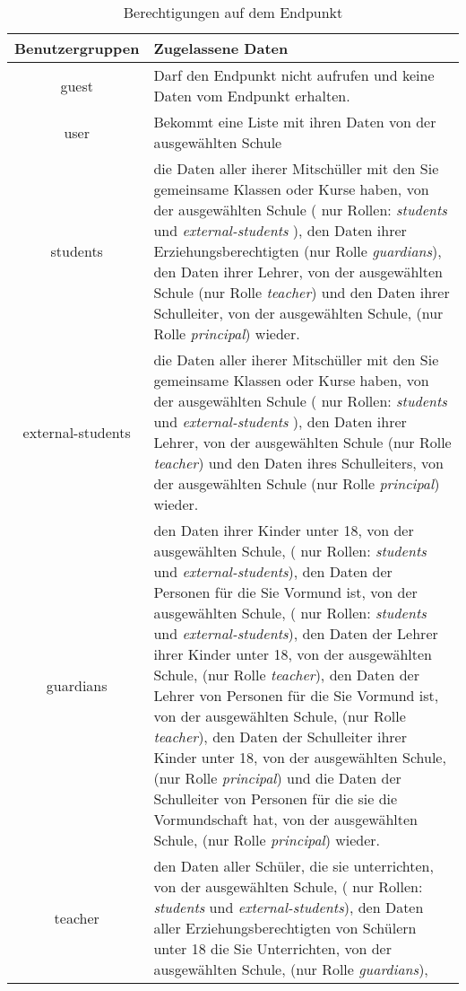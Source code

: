 \begin{longtable}{|c|p{}|}
\caption{Berechtigungen auf dem Endpunkt}
\endfoot
		\caption{Berechtigungen auf dem Endpunkt}
		\label{tab:rest:api:school:users:id:read:right}
\endlastfoot
\hline
\textbf{Benutzergruppen} & \textbf{Zugelassene Daten} \\ \hline
\endhead
guest & Darf den Endpunkt nicht aufrufen und keine Daten vom Endpunkt erhalten. \\ \hline
user & Bekommt eine Liste mit ihren Daten von der ausgewählten Schule \\ \hline 
students & die Daten aller iherer Mitschüller mit den Sie gemeinsame Klassen oder Kurse haben, von der ausgewählten Schule ( nur Rollen: \textit{students} und \textit{external-students} ),
           den Daten ihrer Erziehungsberechtigten (nur Rolle \textit{guardians}), 
					 den Daten ihrer Lehrer, von der ausgewählten Schule (nur Rolle \textit{teacher}) und 
					 den Daten ihrer Schulleiter, von der ausgewählten Schule, (nur Rolle \textit{principal}) wieder.\\ \hline
external-students &  die Daten aller iherer Mitschüller mit den Sie gemeinsame Klassen oder Kurse haben, von der ausgewählten Schule ( nur Rollen: \textit{students} und \textit{external-students} ),
           den Daten ihrer Lehrer, von der ausgewählten Schule (nur Rolle \textit{teacher}) und 
					 den Daten ihres Schulleiters, von der ausgewählten Schule (nur Rolle \textit{principal}) wieder.\\ \hline
guardians & den Daten ihrer Kinder unter 18, von der ausgewählten Schule, ( nur Rollen: \textit{students} und \textit{external-students}), 
					den Daten der Personen für die Sie Vormund ist, von der ausgewählten Schule, ( nur Rollen: \textit{students} und \textit{external-students}), 
					den Daten der Lehrer ihrer Kinder unter 18, von der ausgewählten Schule, (nur Rolle \textit{teacher}),
					den Daten der Lehrer von Personen für die Sie Vormund ist, von der ausgewählten Schule, (nur Rolle \textit{teacher}),
					den Daten der Schulleiter ihrer Kinder unter 18, von der ausgewählten Schule, (nur Rolle \textit{principal}) und
					die Daten der Schulleiter von Personen für die sie die Vormundschaft hat, von der ausgewählten Schule, (nur Rolle \textit{principal})
					wieder.\\ \hline
teacher & den Daten aller Schüler, die sie unterrichten, von der ausgewählten Schule, ( nur Rollen: \textit{students} und \textit{external-students}),
					den Daten aller Erziehungsberechtigten von Schülern unter 18 die Sie Unterrichten, von der ausgewählten Schule, (nur Rolle \textit{guardians}),

\end{longtable}
